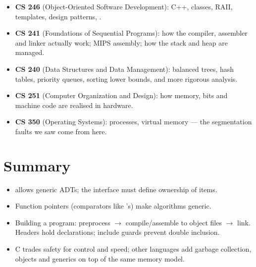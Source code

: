 \begin{itemize}
  \item \textbf{CS 246} (Object-Oriented Software Development): C++, classes, RAII, templates,
    design patterns, .
  \item \textbf{CS 241} (Foundations of Sequential Programs): how the compiler, assembler and
    linker actually work; MIPS assembly; how the stack and heap are managed.
  \item \textbf{CS 240} (Data Structures and Data Management): balanced trees, hash tables,
    priority queues, sorting lower bounds, and more rigorous analysis.
  \item \textbf{CS 251} (Computer Organization and Design): how memory, bits and machine code are
    realised in hardware.
  \item \textbf{CS 350} (Operating Systems): processes, virtual memory --- the segmentation faults
    we saw come from here.
\end{itemize}

\section{Summary}
\begin{itemize}
  \item {} allows generic ADTs; the interface must define ownership of items.
  \item Function pointers (comparators like 's) make algorithms generic.
  \item Building a program: preprocess $\to$ compile/assemble to object files $\to$ link.
    Headers hold declarations; include guards prevent double inclusion.
  \item C trades safety for control and speed; other languages add garbage collection,
    objects and generics on top of the same memory model.
\end{itemize}
